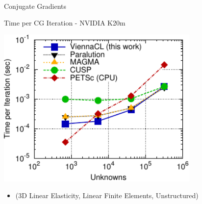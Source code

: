 

\begin{frame}[fragile]{Conjugate Gradients}
 \begin{block}{Time per CG Iteration - NVIDIA K20m}
 \begin{center}
  \vspace*{-0.2cm}
  \includegraphics[width=0.75\textwidth]{figures/time-lame3d-K20m-cg-3-crop}
 \end{center}

 \begin{itemize}
  \item   \vspace*{-0.3cm} {\small (3D Linear Elasticity, Linear Finite Elements, Unstructured)}
 \end{itemize}
 \end{block}   
\end{frame}



